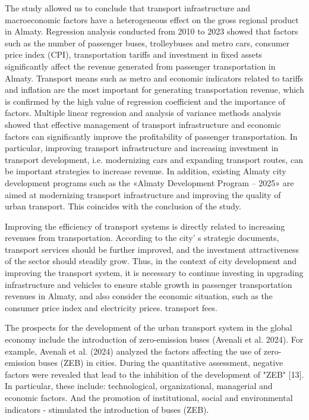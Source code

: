 \begin{multicols}{2}
The study allowed us to conclude that transport infrastructure and
macroeconomic factors have a heterogeneous effect on the gross regional
product in Almaty. Regression analysis conducted from 2010 to 2023
showed that factors such as the number of passenger buses, trolleybuses
and metro cars, consumer price index (CPI), transportation tariffs and
investment in fixed assets significantly affect the revenue generated
from passenger transportation in Almaty. Transport means such as metro
and economic indicators related to tariffs and inflation are the most
important for generating transportation revenue, which is confirmed by
the high value of regression coefficient and the importance of factors.
Multiple linear regression and analysis of variance methods analysis
showed that effective management of transport infrastructure and
economic factors can significantly improve the profitability of
passenger transportation. In particular, improving transport
infrastructure and increasing investment in transport development, i.e.
modernizing cars and expanding transport routes, can be important
strategies to increase revenue. In addition, existing Almaty city
development programs such as the «Almaty Development Program -- 2025»
are aimed at modernizing transport infrastructure and improving the
quality of urban transport. This coincides with the conclusion of the
study.

Improving the efficiency of transport systems is directly related to
increasing revenues from transportation. According to the
city' s strategic documents, transport services should be
further improved, and the investment attractiveness of the sector should
steadily grow. Thus, in the context of city development and improving
the transport system, it is necessary to continue investing in upgrading
infrastructure and vehicles to ensure stable growth in passenger
transportation revenues in Almaty, and also consider the economic
situation, such as the consumer price index and electricity prices.
transport fees.

The prospects for the development of the urban transport system in the
global economy include the introduction of zero-emission buses (Avenali
et al. 2024). For example, Avenali et al. (2024) analyzed the factors
affecting the use of zero-emission buses (ZEB) in cities. During the
quantitative assessment, negative factors were revealed that lead to the
inhibition of the development of "ZEB" {[}13{]}. In particular, these
include: technological, organizational, managerial and economic factors.
And the promotion of institutional, social and environmental indicators
- stimulated the introduction of buses (ZEB).


\end{multicols}
